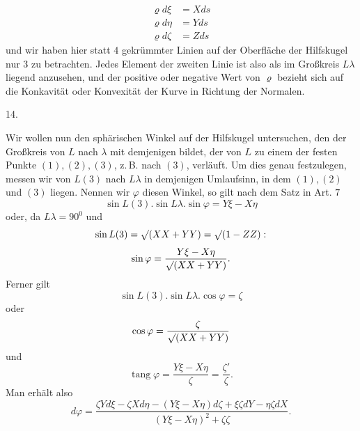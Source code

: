 %
\[
\begin{aligned}
\varrho d\xi&=Xds\\
\varrho d\eta&=Yds\\
\varrho d\zeta&=Zds
\end{aligned}
\]
und wir haben hier statt $4$ gekrümmter Linien auf der Oberfläche der Hilfskugel nur $3$ zu betrachten. Jedes Element der zweiten Linie ist also als im Großkreis $L\lambda$ liegend anzusehen, und der positive oder negative Wert von $\varrho$ bezieht sich auf die Konkavität oder Konvexität der Kurve in Richtung der Normalen.

\begin{center}14.\end{center}
\noindent\hspace*{1.2em}Wir wollen nun den sphärischen Winkel auf der Hilfskugel untersuchen, den der Großkreis von $L$ nach $\lambda$ mit demjenigen bildet, der von $L$ zu einem der festen Punkte $(1),(2),(3)$, z.\,B. nach $(3)$, verläuft. Um dies genau festzulegen, messen wir von $L(3)$ nach $L\lambda$ in demjenigen Umlaufsinn, in dem $(1),(2)$ und $(3)$ liegen. Nennen wir $\varphi$ diesen Winkel, so gilt nach dem Satz in Art. $7$
\[
\sin L(3).\sin L\lambda.\sin\varphi=Y\xi-X\eta
\]
oder, da $L\lambda=90^{0}$ und
\[
\sin L(3)=\mathord{\surd}(XX+YY)=\mathord{\surd}(1-ZZ):
\]
\[
\sin\varphi=\frac{Y\xi-X\eta}{\mathord{\surd}(XX+YY)}.
\]
Ferner gilt
\[
\sin L(3).\sin L\lambda.\cos\varphi=\zeta
\]
oder
\[
\cos\varphi=\frac{\zeta}{\mathord{\surd}(XX+YY)}
\]
und
\[
\operatorname{tang}\varphi=\frac{Y\xi-X\eta}{\zeta}=\frac{\zeta'}{\zeta}.
\]
Man erhält also
\[
d\varphi=\frac{\zeta Yd\xi-\zeta Xd\eta-(Y\xi-X\eta)d\zeta+\xi\zeta dY-\eta\zeta dX}{(Y\xi-X\eta)^{2}+\zeta\zeta}.
\]
